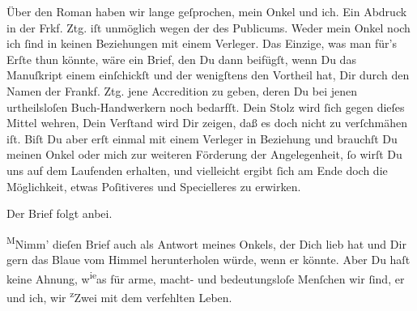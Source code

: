 \pstart
           Über den Roman haben wir lange
               geſprochen, mein Onkel und
               ich. Ein Abdruck in der Frkf. Ztg. iſt unmöglich
               wegen der \label{K_L02709-8v}\label{K_L02709-8}
               des Publicums. Weder mein Onkel noch ich ſind in keinen Beziehungen mit einem Verleger. {\pb}Das Einzige, was man für’s Erſte thun könnte, wäre
               ein Brief, den Du dann beifügſt, wenn Du das Manuſkript einem \label{K_L02709-9v}\label{K_L02709-9} einſchickſt und der wenigſtens den Vortheil hat, Dir durch
               den Namen der Frankf. Ztg. jene Accredition zu
               geben, deren Du bei jenen urtheilsloſen Buch-Handwerkern noch bedarfſt. Dein Stolz
               wird ſich gegen dieſes Mittel wehren, Dein Verſtand wird Dir zeigen, daß es doch {\pb}nicht zu verſchmähen iſt. Biſt Du aber erſt einmal
               mit einem Verleger in Beziehung und brauchſt Du meinen Onkel oder mich zur weiteren Förderung der
               Angelegenheit, ſo wirſt Du uns auf dem Laufenden erhalten, und vielleicht ergibt ſich
               am Ende doch die Möglichkeit, etwas Poſitiveres und Specielleres zu erwirken.\pend
           
\pstart
           Der Brief folgt anbei.\pend
           
\pstart
           {\pb}\substVorne{}\textsuperscript{M}\substDazwischen{}N\substHinten{}imm' dieſen Brief auch als Antwort meines Onkels, der Dich lieb hat und Dir gern das Blaue vom Himmel
               herunterholen würde, wenn er könnte. Aber Du haſt keine Ahnung, w\substVorne{}\textsuperscript{ie}\substDazwischen{}a\substHinten{}s für arme, macht- und bedeutungsloſe Menſchen wir ſind, er und ich, wir \substVorne{}\textsuperscript{z}\substDazwischen{}Z\substHinten{}wei mit dem verfehlten Leben.\pend
           
